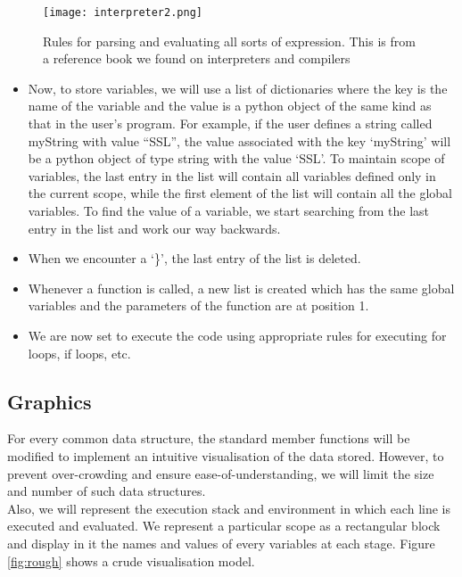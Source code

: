 \documentclass{article}
\begin{document}
\begin{figure}[H]
    \centering
    \texttt{[image: interpreter2.png]}
    \caption{Rules for parsing and evaluating all sorts of expression. This is from a reference book \cite{textbook} we found on interpreters and compilers}
    \label{fig:bookExtract2}
\end{figure}
\begin{itemize}
\item Now, to store variables, we will use a list of dictionaries where the key is the name of the variable and the value is a python object of the same kind as that in the user's program. For example, if the user defines a string called myString with value ``SSL'', the value associated with the key `myString' will be a python object of type string with the value `SSL'. To maintain scope of variables, the last entry in the list will contain all variables defined only in the current scope, while the first element of the list will contain all the global variables. To find the value of a variable, we start searching from the last entry in the list and work our way backwards.
\item When we encounter a `\}', the last entry of the list is deleted.
\item Whenever a function is called, a new list is created which has the same global variables and the parameters of the function are at position 1.
\item We are now set to execute the code using appropriate rules for executing for loops, if loops, etc.
\end{itemize}

\subsection{Graphics}
For every common data structure, the standard member functions will be modified to implement an intuitive visualisation of the data stored. However, to prevent over-crowding and ensure ease-of-understanding, we will limit the size and number of such data structures.\\
Also, we will represent the execution stack and environment in which each line is executed and evaluated. We represent a particular scope as a rectangular block and display in it the names and values of every variables at each stage. Figure \ref{fig:rough} shows a crude
visualisation model.
\end{document}
